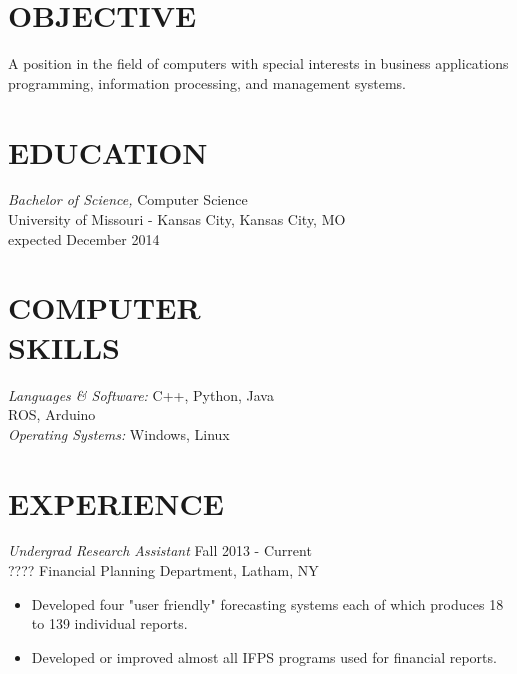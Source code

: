 \documentclass[line,margin]{res}
\begin{document}
\address{\hfill 11408 Colorado Ave \#12, Kansas City, MO 64137}
\address{\hfill (913)235-1070 \textbar \textbar  victoria.chen.wu@gmail.com}

 
\begin{resume}
 
\section{OBJECTIVE}       A position in the field of computers with special 
                interests in business applications programming, 
                information processing, and management systems. 
 
 
\section{EDUCATION} {\sl Bachelor of Science,} Computer Science\\
                University of Missouri - Kansas City, Kansas City, MO \\
                expected December 2014 

\section{COMPUTER \\ SKILLS} {\sl Languages \& Software:} 
		C++, Python, Java \\
		ROS, Arduino \\
                {\sl Operating Systems:} Windows, Linux 
 
\section{EXPERIENCE} 
		{\sl Undergrad Research Assistant} \hfill Fall 2013 - Current \\
                ???? 
                Financial Planning Department, Latham, NY
                 \begin{itemize}  \itemsep -2pt %
                 \item Developed four "user friendly" forecasting 
                    systems each of which produces 18 to 139 
                    individual reports. 
                \item   Developed or improved almost all IFPS 
                    programs used for financial reports. 
                \end{itemize}
 


\end{resume}
\end{document}

